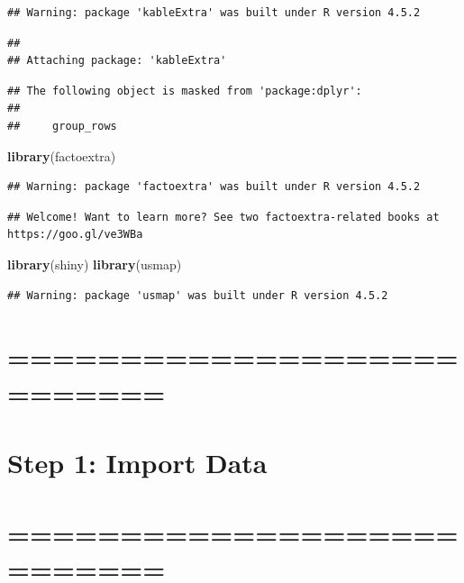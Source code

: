 \documentclass[
]{article}
\newenvironment{Shaded}{\begin{snugshade}}{\end{snugshade}}
\newcommand{\FunctionTok}[1]{\textcolor[rgb]{0.13,0.29,0.53}{\textbf{#1}}}
\newcommand{\NormalTok}[1]{#1}
\begin{document}
\begin{verbatim}
## Warning: package 'kableExtra' was built under R version 4.5.2
\end{verbatim}

\begin{verbatim}
## 
## Attaching package: 'kableExtra'
\end{verbatim}

\begin{verbatim}
## The following object is masked from 'package:dplyr':
## 
##     group_rows
\end{verbatim}

\begin{Shaded}
\begin{Highlighting}[]
\FunctionTok{library}\NormalTok{(factoextra)}
\end{Highlighting}
\end{Shaded}

\begin{verbatim}
## Warning: package 'factoextra' was built under R version 4.5.2
\end{verbatim}

\begin{verbatim}
## Welcome! Want to learn more? See two factoextra-related books at https://goo.gl/ve3WBa
\end{verbatim}

\begin{Shaded}
\begin{Highlighting}[]
\FunctionTok{library}\NormalTok{(shiny)}
\FunctionTok{library}\NormalTok{(usmap)}
\end{Highlighting}
\end{Shaded}

\begin{verbatim}
## Warning: package 'usmap' was built under R version 4.5.2
\end{verbatim}

\section{===========================}\label{section}

\section{Step 1: Import Data}\label{step-1-import-data}

\section{===========================}\label{section-1}
\end{document}
